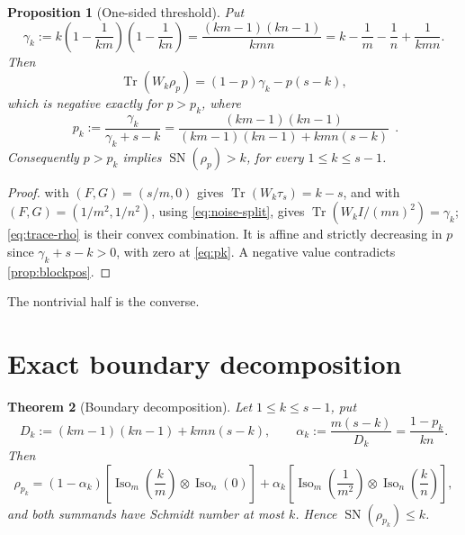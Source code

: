 \documentclass[11pt,reqno]{amsart}
\theoremstyle{plain}
\newtheorem{theorem}{Theorem}[section]
\newtheorem{proposition}[theorem]{Proposition}
\theoremstyle{remark}
\DeclareMathOperator{\Tr}{Tr}
\DeclareMathOperator{\SN}{SN}
\DeclareMathOperator{\Iso}{Iso}
\begin{document}
\begin{proposition}[One-sided threshold]
\label{prop:onesided}
Put
\begin{equation}
\label{eq:gamma}
    \gamma_k
    :=k\left(1-\frac1{km}\right)\left(1-\frac1{kn}\right)
    =\frac{(km-1)(kn-1)}{kmn}
    =k-\frac1m-\frac1n+\frac1{kmn}.
\end{equation}
Then
\begin{equation}
\label{eq:trace-rho}
    \Tr(W_k\rho_p)=(1-p)\gamma_k-p(s-k),
\end{equation}
which is negative exactly for $p>p_k$, where
\begin{equation}
\label{eq:pk}
    \boxed{\;
    p_k
    :=\frac{\gamma_k}{\gamma_k+s-k}
    =\frac{(km-1)(kn-1)}{(km-1)(kn-1)+kmn(s-k)}\;}\,.
\end{equation}
Consequently $p>p_k$ implies $\SN(\rho_p)>k$, for every $1\le k\le s-1$.
\end{proposition}

\begin{proof}
 with $(F,G)=(s/m,0)$ gives $\Tr(W_k\tau_s)=k-s$, and with
$(F,G)=(1/m^2,1/n^2)$, using \cref{eq:noise-split}, gives
$\Tr(W_kI/(mn)^2)=\gamma_k$; \cref{eq:trace-rho} is their convex combination.
It is affine and strictly decreasing in $p$ since $\gamma_k+s-k>0$, with zero
at \cref{eq:pk}.  A negative value contradicts \cref{prop:blockpos}.
\end{proof}

The nontrivial half is the converse.

\section{Exact boundary decomposition}

\begin{theorem}[Boundary decomposition]
\label{thm:decomp}
Let $1\le k\le s-1$, put
\begin{equation}
\label{eq:Dk-alphak}
    D_k:=(km-1)(kn-1)+kmn(s-k),
    \qquad
    \alpha_k:=\frac{m(s-k)}{D_k}=\frac{1-p_k}{kn} .
\end{equation}
Then
\begin{equation}
\label{eq:decomp}
    \rho_{p_k}
    =
    (1-\alpha_k)
    \left[\Iso_m\!\left(\frac km\right)\otimes\Iso_n(0)\right]
    +
    \alpha_k
    \left[\Iso_m\!\left(\frac1{m^2}\right)\otimes\Iso_n\!\left(\frac kn\right)
    \right],
\end{equation}
and both summands have Schmidt number at most $k$.  Hence
$\SN(\rho_{p_k})\le k$.
\end{theorem}
\end{document}
